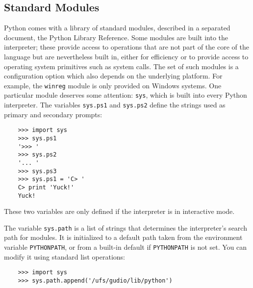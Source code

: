 \documentclass[UTF8]{article}
\begin{document}
\subsection{Standard Modules}
Python comes with a library of standard modules, described in a separated document, the Python
Library Reference. Some modules are built into the interpreter; these provide access to operations
that are not part of the core of the language but are nevertheless built in, either for efficiency
or to provide access to operating system primitives such as system calls. The set of such modules
is a configuration option which also depends on the underlying platform. For example, the
\texttt{winreg} module is only provided on Windows systems. One particular module deserves some
attention: \texttt{sys}, which is built into every Python interpreter. The variables
\texttt{sys.ps1} and \texttt{sys.ps2} define the strings used as primary and secondary prompts:
\begin{verbatim}
    >>> import sys
    >>> sys.ps1
    '>>> '
    >>> sys.ps2
    '... '
    >>> sys.ps3
    >>> sys.ps1 = 'C> '
    C> print 'Yuck!'
    Yuck!
\end{verbatim}

These two variables are only defined if the interpreter is in interactive mode.

The variable \texttt{sys.path} is a list of strings that determines the interpreter's search path
for modules. It is initialized to a default path taken from the environment variable
\texttt{PYTHONPATH}, or from a built-in default if \texttt{PYTHONPATH} is not set. You can modify
it using standard list operations:
\begin{verbatim}
    >>> import sys
    >>> sys.path.append('/ufs/gudio/lib/python')
\end{verbatim}
\end{document}
